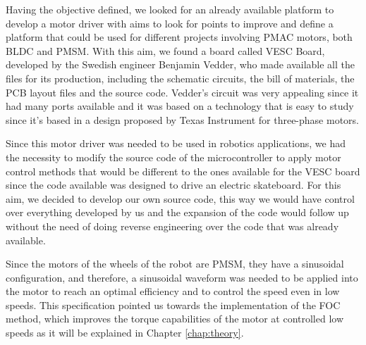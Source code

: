 Having the objective defined, we looked for an already available platform to develop a motor driver with aims to look for points to improve and define a platform that could be used for different projects involving \acf{PMAC} motors, both \acf{BLDC} and \ac{PMSM}. With this aim, we found a board called VESC Board, developed by the Swedish engineer Benjamin Vedder, who made available all the files for its production, including the schematic circuits, the bill of materials, the \acf{PCB} layout files and the source code. Vedder’s circuit was very appealing since it had many ports available and it was based on a technology that is easy to study since it’s based in a design proposed by Texas Instrument for three-phase motors.

Since this motor driver was needed to be used in robotics applications, we had the necessity to modify the source code of the microcontroller to apply motor control methods that would be different to the ones available for the VESC board since the code available was designed to drive an electric skateboard. For this aim, we decided to develop our own source code, this way we would have control over everything developed by us and the expansion of the code would follow up without the need of doing reverse engineering over the code that was already available.

Since the motors of the wheels of the robot are \ac{PMSM}, they have a sinusoidal configuration, and therefore, a sinusoidal waveform was needed to be applied into the motor to reach an optimal efficiency and to control the speed even in low speeds. This specification pointed us towards the implementation of the \acf{FOC} method, which improves the torque capabilities of the motor at controlled low speeds as it will be explained in Chapter \ref{chap:theory}.